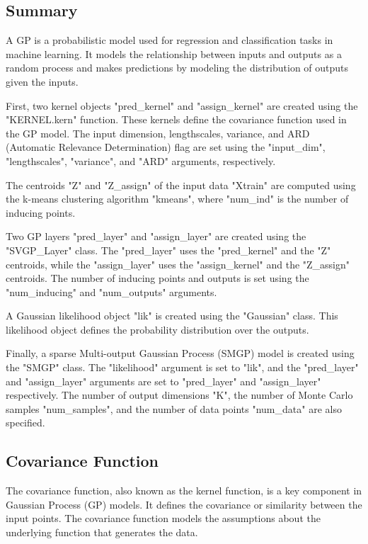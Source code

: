 \documentclass[12pt,a4paper]{report}
\begin{document}
\subsection{Summary}

A GP is a probabilistic model used for regression and classification tasks in machine learning. 
It models the relationship between inputs and outputs as a random process and makes predictions by modeling the distribution of outputs given the inputs.

First, two kernel objects "pred\_kernel" and "assign\_kernel" are created using the "KERNEL.kern" function. 
These kernels define the covariance function used in the GP model. 
The input dimension, lengthscales, variance, and ARD (Automatic Relevance Determination) flag are set using the "input\_dim", "lengthscales", "variance", and "ARD" arguments, respectively.

The centroids "Z" and "Z\_assign" of the input data "Xtrain" are computed using the k-means clustering algorithm "kmeans", where "num\_ind" is the number of inducing points.

Two GP layers "pred\_layer" and "assign\_layer" are created using the "SVGP\_Layer" class. 
The "pred\_layer" uses the "pred\_kernel" and the "Z" centroids, while the "assign\_layer" uses the "assign\_kernel" and the "Z\_assign" centroids. 
The number of inducing points and outputs is set using the "num\_inducing" and "num\_outputs" arguments.

A Gaussian likelihood object "lik" is created using the "Gaussian" class. 
This likelihood object defines the probability distribution over the outputs.

Finally, a sparse Multi-output Gaussian Process (SMGP) model is created using the "SMGP" class.
The "likelihood" argument is set to "lik", and the "pred\_layer" and "assign\_layer" arguments are set to "pred\_layer" and "assign\_layer" respectively. 
The number of output dimensions "K", the number of Monte Carlo samples "num\_samples", and the number of data points "num\_data" are also specified.

\subsection{Covariance Function}

The covariance function, also known as the kernel function, is a key component in Gaussian Process (GP) models. 
It defines the covariance or similarity between the input points. 
The covariance function models the assumptions about the underlying function that generates the data.
\end{document}
